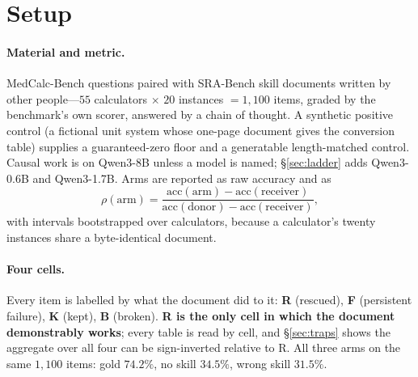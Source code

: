 \documentclass{article}
\begin{document}
\section{Setup}
\label{sec:setup}

\paragraph{Material and metric.} MedCalc-Bench questions paired with SRA-Bench
skill documents written by other people---$55$ calculators $\times$ $20$
instances $=1{,}100$ items, graded by the benchmark's own scorer, answered by a
chain of thought. A synthetic positive control (a fictional unit system whose
one-page document gives the conversion table) supplies a guaranteed-zero floor
and a generatable length-matched control. Causal work is on Qwen3-8B unless a
model is named; \S\ref{sec:ladder} adds Qwen3-0.6B and Qwen3-1.7B. Arms are
reported as raw accuracy and as
\begin{equation}
\rho(\text{arm}) =
\frac{\text{acc}(\text{arm}) - \text{acc}(\text{receiver})}
     {\text{acc}(\text{donor}) - \text{acc}(\text{receiver})},
\label{eq:rho}
\end{equation}
with intervals bootstrapped over calculators, because a calculator's twenty
instances share a byte-identical document.

\paragraph{Four cells.}
\label{sec:cells}
Every item is labelled by what the document did to it: \textbf{R} (rescued),
\textbf{F} (persistent failure), \textbf{K} (kept), \textbf{B} (broken).
\textbf{R is the only cell in which the document demonstrably works}; every
table is read by cell, and \S\ref{sec:traps} shows the aggregate over all four
can be sign-inverted relative to R. All three arms on the same $1{,}100$ items:
gold $74.2\%$, no skill $34.5\%$, wrong skill $31.5\%$.
\end{document}
